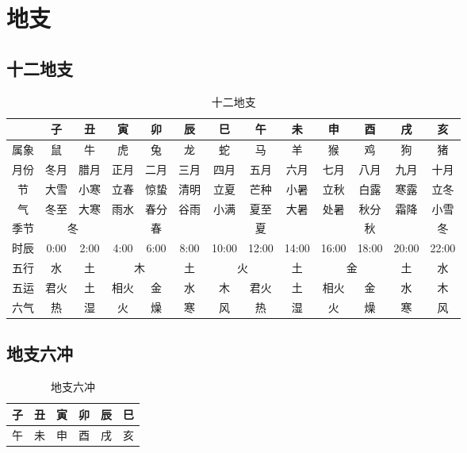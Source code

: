\section{地支}

\subsection{十二地支}
\begin{table}[H]
  \centering
  \caption{十二地支}
  \begin{tabular}{|c|c|c|c|c|c|c|c|c|c|c|c|c|}
    \hline & 子 & 丑 & 寅 & 卯 & 辰 & 巳 & 午 & 未 & 申 & 酉 & 戌 & 亥 \\
    \hline 属象 & 鼠 & 牛 & 虎 & 兔 & 龙 & 蛇 & 马 & 羊 & 猴 & 鸡 & 狗 & 猪 \\
    \hline 月份 \footnotemark & 冬月 & 腊月 & 正月 & 二月 & 三月 & 四月 & 五月 & 六月 & 七月 & 八月 & 九月 & 十月 \\
    \hline 节 \footnotemark & 大雪 & 小寒 & 立春 & 惊蛰 & 清明 & 立夏 & 芒种 & 小暑 & 立秋 & 白露 & 寒露 & 立冬 \\
    \hline 气 \footnotemark & 冬至 & 大寒 & 雨水 & 春分 & 谷雨 & 小满 & 夏至 & 大暑 & 处暑 & 秋分 & 霜降 & 小雪 \\
    \hline 季节 & \multicolumn{2}{c|}{冬} & \multicolumn{3}{c|}{春} & \multicolumn{3}{c|}{夏} & \multicolumn{3}{c|}{秋} & 冬 \\
    \hline 时辰 & 0:00 & 2:00 & 4:00 & 6:00 & 8:00 & 10:00 & 12:00 & 14:00 & 16:00 & 18:00 & 20:00 & 22:00 \\
    \hline 五行 & 水 & 土 & \multicolumn{2}{c|}{木} & 土 & \multicolumn{2}{c|}{火} & 土 & \multicolumn{2}{c|}{金} & 土 & 水 \\
    \hline 五运 & 君火 & 土 & 相火 & 金 & 水 & 木 & 君火 & 土 & 相火 & 金 & 水 & 木 \\
    \hline 六气 & 热 & 湿 & 火 & 燥 & 寒 & 风 & 热 & 湿 & 火 & 燥 & 寒 & 风 \\
    \hline
  \end{tabular}
\end{table}
\addtocounter{footnote}{-3}

\subsection{地支六冲}
\begin{table}[H]
  \centering
  \caption[]{地支六冲\footnotemark}
  \begin{tabular}{|c|c|c|c|c|c|}
    \hline 子 & 丑 & 寅 & 卯 & 辰 & 巳 \\
    \hline 午 & 未 & 申 & 酉 & 戌 & 亥 \\
    \hline
  \end{tabular}
\end{table}


